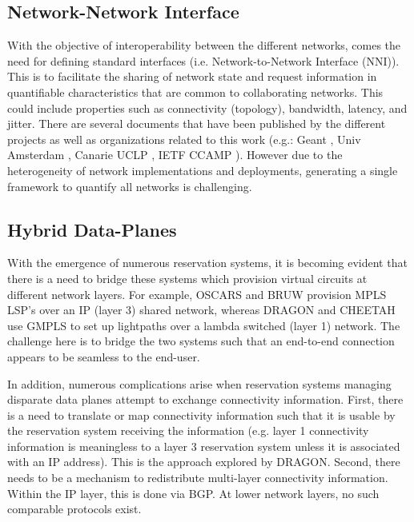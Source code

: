 \documentclass[conference]{IEEEtran}
\begin{document}
\subsection{Network-Network Interface}
With the objective of interoperability between the different networks,
comes the need for defining standard interfaces (i.e. Network-to-Network
Interface (NNI)).  This is to facilitate the sharing of network state and
request information in quantifiable characteristics that are common to
collaborating networks.  This could include properties such as connectivity
(topology), bandwidth, latency, and jitter.  There are several documents
that have been published by the different projects as well as organizations
related to this work (e.g.: Geant \cite{geant},  Univ Amsterdam \cite{ndl}, 
Canarie UCLP \cite{canarie-interop}, IETF CCAMP \cite{ietf-ccamp}). However 
due to the
heterogeneity of network implementations and deployments, generating a single
framework to quantify all networks is challenging.

\subsection{Hybrid Data-Planes}
With the emergence of numerous reservation systems, it is becoming evident 
that there is a need to bridge these systems which provision virtual circuits 
at different network layers.
For example, OSCARS and BRUW provision MPLS LSP's over an IP (layer 3) shared 
network, whereas DRAGON and CHEETAH use
GMPLS to set up lightpaths over a lambda switched (layer 1) network.
The challenge here is to bridge the two systems such
that an end-to-end connection appears to be seamless to the end-user.

In addition, numerous complications arise when reservation systems managing 
disparate data planes attempt to exchange connectivity information.  First, 
there is a need to translate or map connectivity information such that it is 
usable by the reservation system receiving the information (e.g. layer 1 
connectivity information is meaningless to a layer 3 reservation system unless 
it is associated with an IP address).  This is the approach explored by DRAGON.
Second, there needs to be a mechanism to redistribute multi-layer connectivity 
information. Within the IP layer, this is done via BGP.  At lower network 
layers, no such comparable protocols exist.

\end{document}
